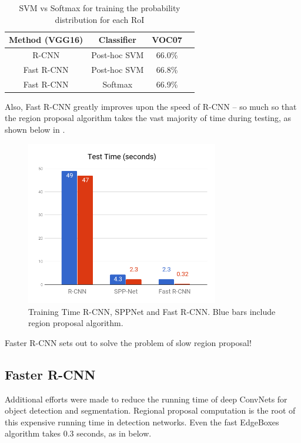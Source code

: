 \begin{table}[H]
	\centering
	\begin{tabular}{c c c c} 
		\hline
		Method (VGG16) & Classifier & VOC07 \\ [0.5ex] 
		\hline
		R-CNN & Post-hoc SVM & 66.0\% \\
		Fast R-CNN & Post-hoc SVM & 66.8\% \\
		Fast R-CNN & Softmax & 66.9\% \\
		\hline
	\end{tabular}
	\caption{SVM vs Softmax for training the probability distribution for each RoI}
	\label{t:fastrcnn-svmvssoftmax}
\end{table}

Also, Fast R-CNN greatly improves upon the speed of R-CNN -- so much so that the region proposal algorithm takes the vast majority of time during testing, as shown below in .

\begin{figure}[H]
	\centering
	\includegraphics[width=0.75\textwidth]{images/chart.png} %
	\caption{Training Time R-CNN, SPPNet and Fast R-CNN. Blue bars include region proposal algorithm.}
	\label{f:chart}
\end{figure}

Faster R-CNN sets out to solve the problem of slow region proposal!

\subsection{Faster R-CNN}\label{s:nnevo-fasterrcnn}

Additional efforts were made to reduce the running time of deep ConvNets for object detection and segmentation. Regional proposal computation is the root of this expensive running time in detection networks. Even the fast EdgeBoxes algorithm takes 0.3 seconds, as in  below.


